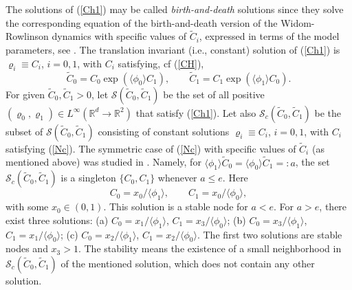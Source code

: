 \documentclass[reqno,11pt]{amsart}
\theoremstyle{definition}
\theoremstyle{remark}
\numberwithin{equation}{section}
\begin{document}
The solutions of (\ref{Ch1}) may be called \emph{birth-and-death}
solutions since they solve the corresponding equation of the
birth-and-death version of the Widom-Rowlinson dynamics with
specific values of $\widetilde{C}_i$, expressed in terms of the
model parameters, see \cite[eq. (4.13)]{FKKO}. The translation
invariant (i.e., constant) solution of (\ref{Ch1}) is
$\varrho_i\equiv C_i$, $i=0,1$, with $C_i$ satisfying, cf
(\ref{CH}),
\begin{equation}
  \label{Nc}
\widetilde{C}_0 = C_0 \exp\left( \langle \phi_0 \rangle C_1 \right),
\qquad \widetilde{C}_1 = C_1 \exp\left( \langle \phi_1 \rangle C_0
\right).
\end{equation}
For given $\widetilde{C}_0, \widetilde{C}_1>0$, let
$\mathcal{S}(\widetilde{C}_0, \widetilde{C}_1)$ be the set of all
positive $(\varrho_0,\varrho_1)\in L^\infty (\mathds{R}^d \to
\mathds{R}^2)$ that satisfy (\ref{Ch1}). Let also
$\mathcal{S}_c(\widetilde{C}_0, \widetilde{C}_1)$ be the subset of
$\mathcal{S}(\widetilde{C}_0, \widetilde{C}_1)$ consisting of
constant solutions $\varrho_i \equiv C_i$, $i=0,1$, with $C_i$
satisfying (\ref{Nc}). The symmetric case of (\ref{Nc}) with
specific values of $\widetilde{C}_i$  (as mentioned above) was
studied in \cite[Section 5]{FKKO}. Namely, for $ \langle \phi_1
\rangle \widetilde{C}_0 = \langle \phi_0 \rangle \widetilde{C}_1
=:a$, the set $\mathcal{S}_c(\widetilde{C}_0, \widetilde{C}_1)$ is a
singleton $\{C_0,C_1\}$ whenever $a\leq e$. Here
\begin{equation}
  \label{CH2}
C_0 = x_0/\langle \phi_1 \rangle , \qquad C_1 =x_0/ \langle
\phi_0\rangle ,
\end{equation}
with some $x_0 \in (0,1)$.  This solution is a stable node for
$a<e$. For $a>e$, there exist three solutions: (a) $ C_0 =
x_1/\langle \phi_1 \rangle$, $ C_1 = x_3/\langle \phi_0 \rangle$;
(b) $ C_0 = x_3/\langle \phi_1 \rangle$, $ C_1 = x_1/\langle \phi_0
\rangle$; (c) $ C_0 = x_2/\langle \phi_1 \rangle$,  $ C_1 =
x_2/\langle \phi_0 \rangle$. The first two solutions are stable
nodes and $x_3>1$. The stability means the existence of a small
neighborhood in $\mathcal{S}_c(\widetilde{C}_0, \widetilde{C}_1)$ of
the mentioned solution, which does not contain any other solution.
\end{document}
